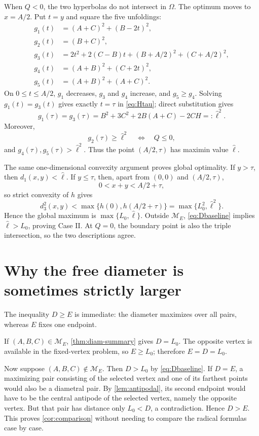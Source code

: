 \documentclass[11pt]{article}
\theoremstyle{definition}
\begin{document}
When $Q<0$, the two hyperbolas do not intersect in $\Omega$.  The optimum moves
to $x=A/2$.  Put $t=y$ and square the five unfoldings:
\begin{align*}
 g_1(t)&=(A+C)^2+(B-2t)^2,\\
 g_2(t)&=(B+C)^2,\\
 g_3(t)&=2t^2+2(C-B)t+(B+A/2)^2+(C+A/2)^2,\\
 g_4(t)&=(A+B)^2+(C+2t)^2,\\
 g_5(t)&=(A+B)^2+(A+C)^2.
\end{align*}
On $0\le t\le A/2$, $g_1$ decreases, $g_3$ and $g_4$ increase, and
$g_5\ge g_4$.  Solving $g_1(t)=g_3(t)$ gives exactly $t=\tau$ in
\eqref{eq:Htau}; direct substitution gives
\begin{equation}\label{eq:g-balance}
  g_1(\tau)=g_3(\tau)=B^2+3C^2+2B(A+C)-2CH=:\widehat\ell^2.
\end{equation}
Moreover,
\begin{equation}
  g_2(\tau)\ge\widehat\ell^2
  \quad\Longleftrightarrow\quad Q\le0,
\end{equation}
and $g_4(\tau),g_5(\tau)>\widehat\ell^2$.  Thus the point
$(A/2,\tau)$ has maximin value $\widehat\ell$.

The same one-dimensional convexity argument proves global optimality.  If
$y>\tau$, then $d_1(x,y)<\widehat\ell$.  If $y\le\tau$, then, apart from
$(0,0)$ and $(A/2,\tau)$,
\[
  0<x+y<A/2+\tau,
\]
so strict convexity of $h$ gives
\[
  d_3^2(x,y)<\max\{h(0),h(A/2+\tau)\}
  =\max\{L_0^2,\widehat\ell^2\}.
\]
Hence the global maximum is $\max\{L_0,\widehat\ell\}$.  Outside
$\mathcal M_E$, \eqref{eq:Dbaseline} implies
$\widehat\ell>L_0$, proving Case II.  At $Q=0$, the boundary point is also the
triple intersection, so the two descriptions agree.

\section{Why the free diameter is sometimes strictly larger}

The inequality $D\ge E$ is immediate: the diameter maximizes over all pairs,
whereas $E$ fixes one endpoint.

If $(A,B,C)\in\mathcal M_E$, \cref{thm:diam-summary} gives $D=L_0$.
The opposite vertex is available in the fixed-vertex problem, so $E\ge L_0$;
therefore $E=D=L_0$.

Now suppose $(A,B,C)\notin\mathcal M_E$.  Then $D>L_0$ by
\eqref{eq:Dbaseline}.  If $D=E$, a maximizing pair consisting of the selected
vertex and one of its farthest points would also be a diametral pair.
By \cref{lem:antipodal}, its second endpoint would have to be the central
antipode of the selected vertex, namely the opposite vertex.  But that pair
has distance only $L_0<D$, a contradiction.  Hence $D>E$.  This proves
\cref{cor:comparison} without needing to compare the radical formulas case by
case.
\end{document}
